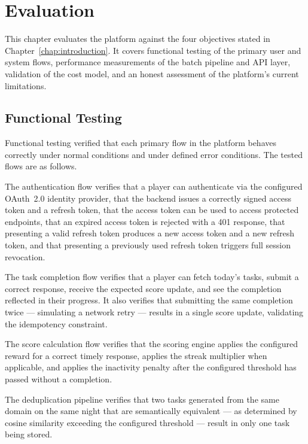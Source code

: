 %
%
\chapter{Evaluation}
\label{chap:evaluation}

This chapter evaluates the platform against the four objectives stated in Chapter~\ref{chap:introduction}. It covers functional testing of the primary user and system flows, performance measurements of the batch pipeline and API layer, validation of the cost model, and an honest assessment of the platform's current limitations.

\section{Functional Testing}

Functional testing verified that each primary flow in the platform behaves correctly under normal conditions and under defined error conditions. The tested flows are as follows.

The authentication flow verifies that a player can authenticate via the configured OAuth~2.0 identity provider, that the backend issues a correctly signed access token and a refresh token, that the access token can be used to access protected endpoints, that an expired access token is rejected with a 401 response, that presenting a valid refresh token produces a new access token and a new refresh token, and that presenting a previously used refresh token triggers full session revocation.

The task completion flow verifies that a player can fetch today's tasks, submit a correct response, receive the expected score update, and see the completion reflected in their progress. It also verifies that submitting the same completion twice --- simulating a network retry --- results in a single score update, validating the idempotency constraint.

The score calculation flow verifies that the scoring engine applies the configured reward for a correct timely response, applies the streak multiplier when applicable, and applies the inactivity penalty after the configured threshold has passed without a completion.

The deduplication pipeline verifies that two tasks generated from the same domain on the same night that are semantically equivalent --- as determined by cosine similarity exceeding the configured threshold --- result in only one task being stored.

